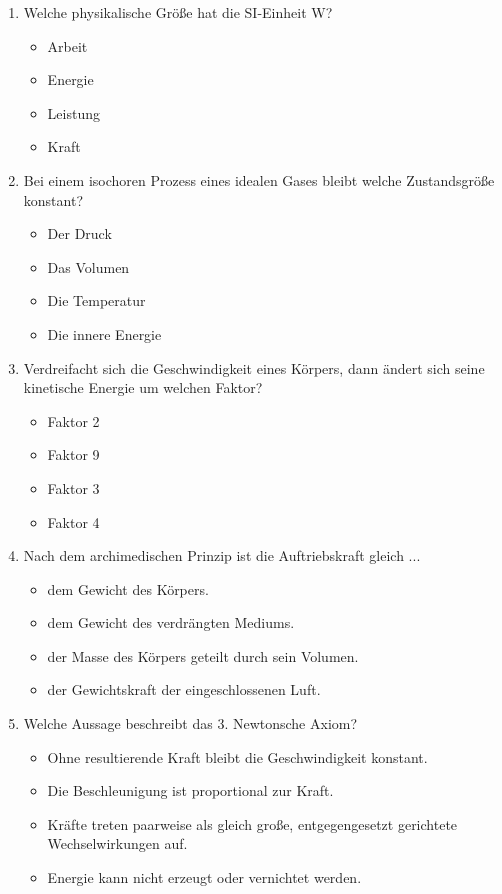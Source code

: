 \documentclass[11pt, a4paper]{article}
\begin{document}
\begin{enumerate}[label=\arabic*.,itemsep=18pt]
    \item Welche physikalische Größe hat die SI-Einheit \si{\watt}?
    \begin{itemize}[label={$\square$},itemsep=1pt,topsep=0pt]
        \item Arbeit
        \item Energie
        \item Leistung
        \item Kraft
    \end{itemize}

    \item Bei einem isochoren Prozess eines idealen Gases bleibt welche Zustandsgröße konstant?
    \begin{itemize}[label={$\square$},itemsep=1pt,topsep=0pt]
        \item Der Druck
        \item Das Volumen
        \item Die Temperatur
        \item Die innere Energie
    \end{itemize}

    \item Verdreifacht sich die Geschwindigkeit eines Körpers, dann ändert sich seine kinetische Energie um welchen Faktor?
    \begin{itemize}[label={$\square$},itemsep=1pt,topsep=0pt]
        \item Faktor 2
        \item Faktor 9
        \item Faktor 3
        \item Faktor 4
    \end{itemize}

    \item Nach dem archimedischen Prinzip ist die Auftriebskraft gleich ...
    \begin{itemize}[label={$\square$},itemsep=1pt,topsep=0pt]
        \item dem Gewicht des Körpers.
        \item dem Gewicht des verdrängten Mediums.
        \item der Masse des Körpers geteilt durch sein Volumen.
        \item der Gewichtskraft der eingeschlossenen Luft.
    \end{itemize}

    \item Welche Aussage beschreibt das 3. Newtonsche Axiom?
    \begin{itemize}[label={$\square$},itemsep=1pt,topsep=0pt]
        \item Ohne resultierende Kraft bleibt die Geschwindigkeit konstant.
        \item Die Beschleunigung ist proportional zur Kraft.
        \item Kräfte treten paarweise als gleich große, entgegengesetzt gerichtete Wechselwirkungen auf.
        \item Energie kann nicht erzeugt oder vernichtet werden.
    \end{itemize}


\end{enumerate}
\end{document}
